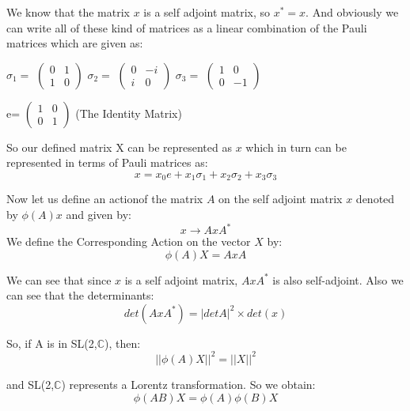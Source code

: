 We know that the matrix $x$ is a self adjoint matrix,  so $x^*=x$. And obviously we can write all of these kind of matrices as a linear combination of the Pauli matrices which are given as:
\begin{center}
    $\sigma_1=$
    $\begin{pmatrix}
    0 & 1 \\
    1 & 0 
    \end{pmatrix}$
    $\sigma_2=$
     $\begin{pmatrix}
    0 & -i \\
    i & 0 
    \end{pmatrix}$
    $\sigma_3=$
    $\begin{pmatrix}
    1 & 0 \\
    0 & -1 
    \end{pmatrix}$
    
    e=
    $\begin{pmatrix}
    1 & 0 \\
    0 & 1 
    \end{pmatrix}$  (The Identity Matrix)
    \end{center}
    
So our defined matrix X can be represented as $x$ which in turn can be represented in terms of Pauli matrices as:
\begin{equation}
    x=x_0e+x_1\sigma_1+x_2\sigma_2+x_3\sigma_3
\end{equation}


Now let us define an actionof the matrix $A$ on the self adjoint matrix $x$ denoted by $\phi (A)x$ and given by:
\begin{equation}
    x \longrightarrow AxA^{*}
\end{equation}
We define the Corresponding Action on the vector $X$ by:
\begin{equation}
    \phi(A)X=AxA
\end{equation}

We can see that since $x$ is a self adjoint matrix, $AxA^*$ is also self-adjoint. Also we can see that the determinants:
\begin{equation}
    det(AxA^{*})=|detA|^{2} \times det(x)
\end{equation}


So, if A is in SL(2,$\mathbb{C}$), then:
\begin{equation}
    ||\phi(A)X||^{2}=||X||^{2}
\end{equation}

and SL(2,$\mathbb{C}$) represents a Lorentz transformation. So we obtain:
\begin{equation}
    \phi(AB)X=\phi(A)\phi(B)X
\end{equation}


